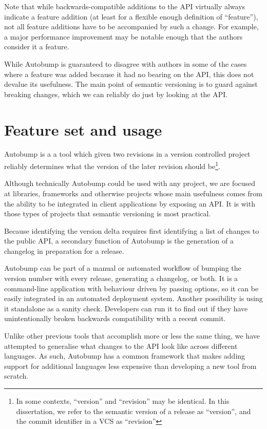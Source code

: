 \documentclass{l4proj}
\begin{document}
Note that while backwards-compatible additions to the API virtually
always indicate a feature addition (at least for a flexible enough
definition of ``feature''), not all feature additions have to be
accompanied by such a change. For example, a major performance
improvement may be notable enough that the authors consider it a
feature.

While Autobump is guaranteed to disagree with authors in some of the
cases where a feature was added because it had no bearing on the API,
this does not devalue its usefulness. The main point of semantic
versioning is to guard against breaking changes, which we can reliably
do just by looking at the API.

\section{Feature set and usage}


Autobump is a a tool which given two revisions in a version
controlled project reliably determines what the version of the later
revision should be\footnote{In some contexts, ``version'' and
``revision'' may be identical. In this dissertation, we refer to the
semantic version of a release as ``version'', and the commit
identifier in a VCS as ``revision''}.

Although technically Autobump could be used with any project, we are
focused at libraries, frameworks and otherwise projects whose main
usefulness comes from the ability to be integrated in client
applications by exposing an API. It is with those types of projects
that semantic versioning is most practical.

Because identifying the version delta requires first identifying a
list of changes to the public API, a secondary function of Autobump is
the generation of a changelog in preparation for a release.

Autobump can be part of a manual or automated workflow of bumping the
version number with every release, generating a changelog, or both. It
is a command-line application with behaviour driven by passing
options, so it can be easily integrated in an automated deployment
system. Another possibility is using it standalone as a sanity check.
Developers can run it to find out if they have unintentionally broken
backwards compatibility with a recent commit.

Unlike other previous tools that accomplish more or less the same
thing, we have attempted to generalise what changes to the API look
like across different languages. As such, Autobump has a common
framework that makes adding support for additional languages less
expensive than developing a new tool from scratch.
\end{document}
